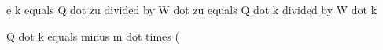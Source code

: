 e k equals Q dot zu divided by W dot zu equals Q dot k divided by W dot k  

Q dot k equals minus m dot times (
